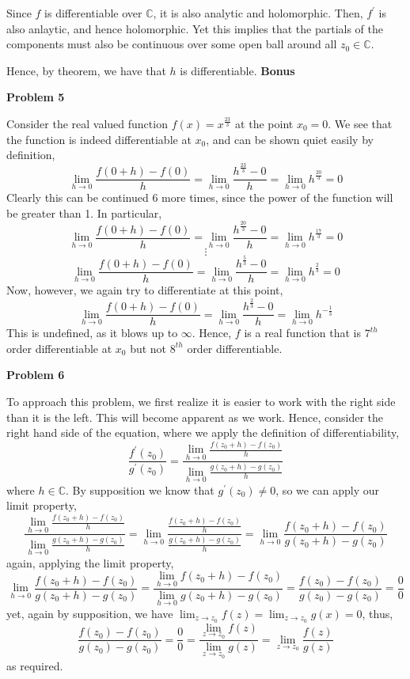 \documentclass[10pt]{article}
\newcommand{\C}{\mathbb{C}}
\begin{document}
Since $f$ is differentiable over $\C$, it is also analytic and holomorphic. Then, $f^{\prime}$ is also anlaytic, and hence holomorphic. Yet this implies that the partials of the components must also be continuous over some open ball around all $z_{0} \in \C$.

Hence, by theorem, we have that $h$ is differentiable.
\newpage
\textbf{Bonus}

\textbf{Problem 5}

Consider the real valued function $f(x) = x^{\frac{23}{3}}$ at the point $x_{0} = 0$. We see that the function is indeed differentiable at $x_{0}$, and can be shown quiet easily by definition,
$$\lim_{h\to 0}\frac{f(0 + h) - f(0)}{h} = \lim_{h\to 0}\frac{h^{\frac{23}{3}} - 0}{h} = \lim_{h\to 0}h^{\frac{20}{3}}= 0$$
Clearly this can be continued 6 more times, since the power of the function will be greater than 1. In particular,
$$\lim_{h\to 0}\frac{f(0 + h) - f(0)}{h} = \lim_{h\to 0}\frac{h^{\frac{20}{3}} - 0}{h} = \lim_{h\to 0}h^{\frac{17}{3}}= 0$$
$$\vdots$$
$$\lim_{h\to 0}\frac{f(0 + h) - f(0)}{h} = \lim_{h\to 0}\frac{h^{\frac{5}{3}} - 0}{h} = \lim_{h\to 0}h^{\frac{2}{3}}= 0$$
Now, however, we again try to differentiate at this point,
$$\lim_{h\to 0}\frac{f(0 + h) - f(0)}{h} = \lim_{h\to 0}\frac{h^{\frac{2}{3}} - 0}{h} = \lim_{h\to 0}h^{-\frac{1}{3}}$$
This is undefined, as it blows up to $\infty$. Hence, $f$ is a real function that is $7^{th}$ order differentiable at $x_{0}$ but not $8^{th}$ order differentiable.

\textbf{Problem 6}

To approach this problem, we first realize it is easier to work with the right side than it is the left. This will become apparent as we work. Hence, consider the right hand side of the equation, where we apply the definition of differentiability,
$$\frac{f^{\prime}(z_{0})}{g^{\prime}(z_{0})} = \frac{\lim_{h\to 0}\frac{f(z_{0} + h) - f(z_{0})}{h}}{\lim_{h\to 0}\frac{g(z_{0} + h) - g(z_{0})}{h}}$$
where $h\in \C$. By supposition we know that $g^{\prime}(z_{0}) \neq 0$, so we can apply our limit property,
$$\frac{\lim_{h\to 0}\frac{f(z_{0} + h) - f(z_{0})}{h}}{\lim_{h\to 0}\frac{g(z_{0} + h) - g(z_{0})}{h}}=\lim_{h\to 0}\frac{\frac{f(z_{0} + h) - f(z_{0})}{h}}{\frac{g(z_{0} + h) - g(z_{0})}{h}} = \lim_{h\to 0}\frac{f(z_{0}+h) -f(z_{0})}{g(z_{0} + h) - g(z_{0})}$$
again, applying the limit property,
$$\lim_{h\to 0}\frac{f(z_{0}+h) -f(z_{0})}{g(z_{0} + h) - g(z_{0})} = \frac{\lim_{h\to 0}f(z_{0}+h) -f(z_{0})}{\lim_{h\to 0}g(z_{0} + h) - g(z_{0})} = \frac{f(z_{0}) - f(z_{0})}{g(z_{0}) - g(z_{0})} = \frac{0}{0}$$
yet, again by supposition, we have $\lim_{z\to z_{0}}f(z) = \lim_{z\to z_{0}}g(x) = 0$, thus,
$$\frac{f(z_{0}) - f(z_{0})}{g(z_{0}) - g(z_{0})} = \frac{0}{0} = \frac{\lim_{z\to z_{0}}f(z)}{\lim_{z\to z_{0}}g(z)} = \lim_{z\to z_{0}}\frac{f(z)}{g(z)}$$
as required.
\end{document}
